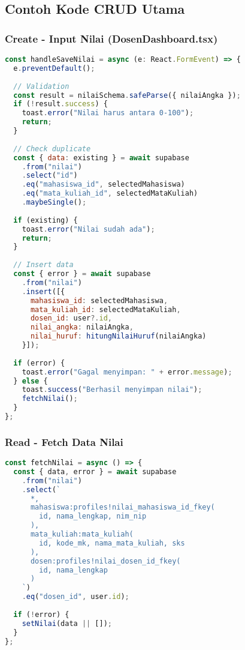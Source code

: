 \documentclass[12pt,a4paper]{article}
\begin{document}
\subsection{Contoh Kode CRUD Utama}

\subsubsection{Create - Input Nilai (DosenDashboard.tsx)}

\begin{lstlisting}[language=JavaScript]
const handleSaveNilai = async (e: React.FormEvent) => {
  e.preventDefault();
  
  // Validation
  const result = nilaiSchema.safeParse({ nilaiAngka });
  if (!result.success) {
    toast.error("Nilai harus antara 0-100");
    return;
  }
  
  // Check duplicate
  const { data: existing } = await supabase
    .from("nilai")
    .select("id")
    .eq("mahasiswa_id", selectedMahasiswa)
    .eq("mata_kuliah_id", selectedMataKuliah)
    .maybeSingle();
    
  if (existing) {
    toast.error("Nilai sudah ada");
    return;
  }
  
  // Insert data
  const { error } = await supabase
    .from("nilai")
    .insert([{
      mahasiswa_id: selectedMahasiswa,
      mata_kuliah_id: selectedMataKuliah,
      dosen_id: user?.id,
      nilai_angka: nilaiAngka,
      nilai_huruf: hitungNilaiHuruf(nilaiAngka)
    }]);
    
  if (error) {
    toast.error("Gagal menyimpan: " + error.message);
  } else {
    toast.success("Berhasil menyimpan nilai");
    fetchNilai();
  }
};
\end{lstlisting}

\subsubsection{Read - Fetch Data Nilai}

\begin{lstlisting}[language=JavaScript]
const fetchNilai = async () => {
  const { data, error } = await supabase
    .from("nilai")
    .select(`
      *,
      mahasiswa:profiles!nilai_mahasiswa_id_fkey(
        id, nama_lengkap, nim_nip
      ),
      mata_kuliah:mata_kuliah(
        id, kode_mk, nama_mata_kuliah, sks
      ),
      dosen:profiles!nilai_dosen_id_fkey(
        id, nama_lengkap
      )
    `)
    .eq("dosen_id", user.id);
    
  if (!error) {
    setNilai(data || []);
  }
};
\end{lstlisting}
\end{document}
